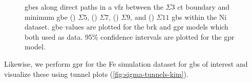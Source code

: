 \documentclass[final,twocolumn,12pt]{elsarticle}
\begin{document}
\begin{figure}[!htb]
\begin{subfigure}[b]{0.48\textwidth}
			\caption{}
			\label{fig:tunnel-3-11-olmsted}
		\end{subfigure}
		\caption{\Glspl{gbe} along direct paths in a \gls{vfz} between the $\Sigma3$ \gls{ct} boundary and minimum \gls{gbe} () $\Sigma5$, () $\Sigma7$, () $\Sigma9$, and () $\Sigma11$ \glspl{gb} within the Ni \citet{olmstedSurveyComputedGrain2009} dataset. \Gls{gbe} values are plotted for the \gls{brk} and \gls{gpr} models which both used \citet{olmstedSurveyComputedGrain2009} as \inpt{} data. 95\% confidence intervals are plotted for the \gls{gpr} model. }
		\label{fig:sigma-tunnels-olmsted}
	\end{figure}
	
	Likewise, we perform \gls{gpr} for the Fe simulation dataset for \glspl{gb} of interest and visualize these using tunnel plots (\cref{fig:sigma-tunnels-kim}).
	
\end{document}
